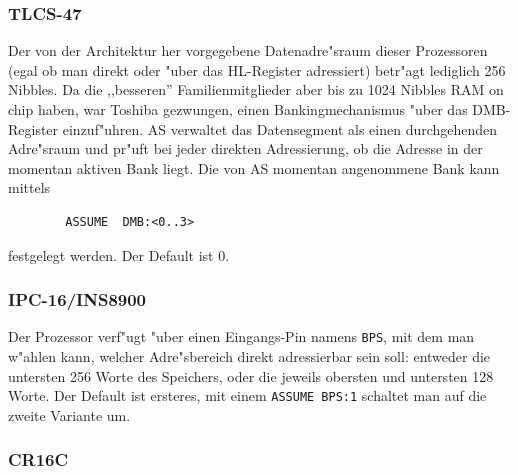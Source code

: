 \documentclass[12pt,a4paper,twoside]{report}
\newcommand{\asname}{AS}
\begin{document}

\subsubsection{TLCS-47}

Der von der Architektur her vorgegebene Datenadre"sraum dieser
Prozessoren (egal ob man direkt oder "uber das HL-Register adressiert)
betr"agt lediglich 256 Nibbles.  Da die ,,besseren'' Familienmitglieder
aber bis zu 1024 Nibbles RAM on chip haben, war Toshiba gezwungen, einen
Bankingmechanismus "uber das DMB-Register einzuf"uhren.  \asname{} verwaltet
das Datensegment als einen durchgehenden Adre"sraum und pr"uft bei jeder
direkten Adressierung, ob die Adresse in der momentan aktiven Bank
liegt.  Die von \asname{} momentan angenommene Bank kann mittels
\begin{verbatim}
        ASSUME  DMB:<0..3>
\end{verbatim}
festgelegt werden.  Der Default ist 0.


\subsubsection{IPC-16/INS8900}
\label{PACEAssume}

Der Prozessor verf"ugt "uber einen Eingangs-Pin namens {\tt BPS}, mit dem man
w"ahlen kann, welcher Adre"sbereich direkt adressierbar sein soll: entweder
die untersten 256 Worte des Speichers, oder die jeweils obersten und untersten
128 Worte.  Der Default ist ersteres, mit einem {\tt ASSUME BPS:1} schaltet man
auf die zweite Variante um.


\subsubsection{CR16C}
\end{document}
